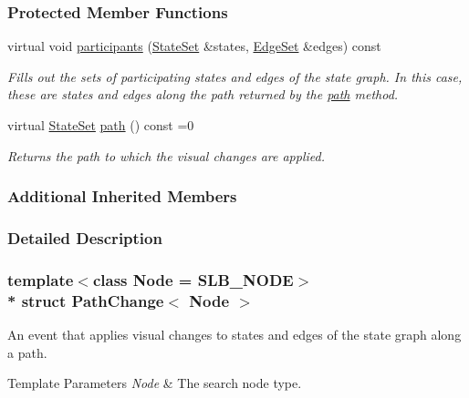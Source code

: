 \subsubsection*{Protected Member Functions}
\begin{DoxyCompactItemize}
\item 
virtual void \hyperlink{structPathChange_a1c5c5ebdca861a49bd77eb2428555a15}{participants} (\hyperlink{structUniformChange_afc89af5d5e897d7664eb9ae7770d145c}{State\+Set} \&states, \hyperlink{structUniformChange_a2afec8b1a5887f2c6fad054d6b739fc5}{Edge\+Set} \&edges) const 
\begin{DoxyCompactList}\small\item\em Fills out the sets of participating states and edges of the state graph. In this case, these are states and edges along the path returned by the \hyperlink{structPathChange_a31e266b891b5fe3777f64a0abe2631e8}{path} method. \end{DoxyCompactList}\item 
virtual \hyperlink{structUniformChange_afc89af5d5e897d7664eb9ae7770d145c}{State\+Set} \hyperlink{structPathChange_a31e266b891b5fe3777f64a0abe2631e8}{path} () const =0
\begin{DoxyCompactList}\small\item\em Returns the path to which the visual changes are applied. \end{DoxyCompactList}\end{DoxyCompactItemize}
\subsubsection*{Additional Inherited Members}


\subsubsection{Detailed Description}
\subsubsection*{template$<$class Node = S\+L\+B\+\_\+\+N\+O\+DE$>$\\*
struct Path\+Change$<$ Node $>$}

An event that applies visual changes to states and edges of the state graph along a path. 


\begin{DoxyTemplParams}{Template Parameters}
{\em Node} & The search node type. \\
\hline
\end{DoxyTemplParams}


